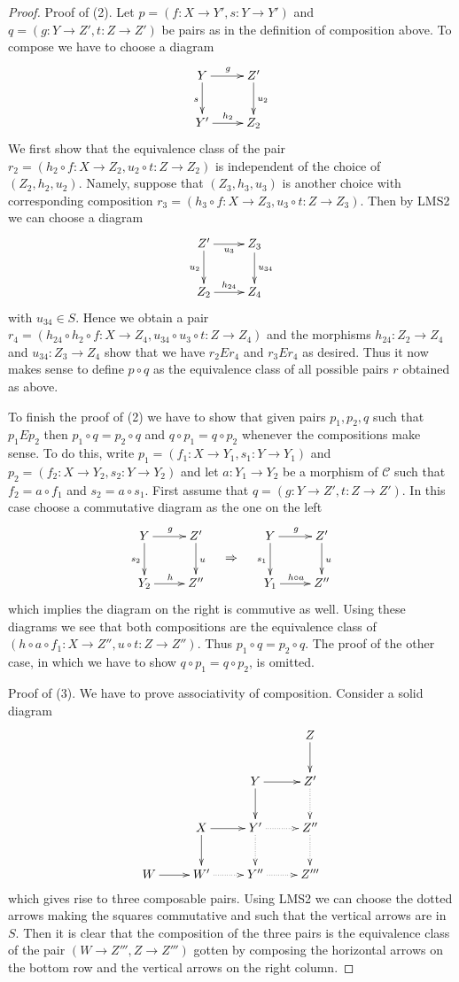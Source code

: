 \begin{proof}
\medskip\noindent
Proof of (2). Let  $p = (f : X \to Y', s : Y \to Y')$ and
$q = (g : Y \to Z', t : Z \to Z')$ be pairs as in the definition of composition
above. To compose we have to choose a diagram
$$
\xymatrix{
Y \ar[d]_s \ar[r]^g & Z' \ar[d]^{u_2} \\
Y' \ar[r]^{h_2} & Z_2
}
$$
We first show that the equivalence class of the pair
$r_2 = (h_2 \circ f : X \to Z_2, u_2 \circ t : Z \to Z_2)$
is independent of the choice of $(Z_2, h_2, u_2)$. Namely, suppose
that $(Z_3, h_3, u_3)$ is another choice with corresponding composition
$r_3 = (h_3 \circ f : X \to Z_3, u_3 \circ t : Z \to Z_3)$.
Then by LMS2 we can choose a diagram
$$
\xymatrix{
Z' \ar[d]_{u_2} \ar[r]_{u_3} & Z_3 \ar[d]^{u_{34}} \\
Z_2 \ar[r]^{h_{24}} & Z_4
}
$$
with $u_{34} \in S$. Hence we obtain a pair
$r_4 =
(h_{24} \circ h_2 \circ f : X \to Z_4, u_{34} \circ u_3 \circ t : Z \to Z_4)$
and the morphisms $h_{24} : Z_2 \to Z_4$ and
$u_{34} : Z_3 \to Z_4$ show that we have $r_2Er_4$ and
$r_3Er_4$ as desired. Thus it now makes sense to define
$p \circ q$ as the equivalence class of all possible pairs $r$
obtained as above.

\medskip\noindent
To finish the proof of (2) we have to show that given pairs
$p_1, p_2, q$ such that $p_1Ep_2$ then $p_1 \circ q = p_2 \circ q$ and
$q \circ p_1 = q \circ p_2$ whenever the compositions make sense.
To do this, write $p_1 = (f_1 : X \to Y_1, s_1 : Y \to Y_1)$ and
$p_2 = (f_2 : X \to Y_2, s_2 : Y \to Y_2)$ and let
$a : Y_1 \to Y_2$ be a morphism of $\mathcal{C}$ such that
$f_2 = a \circ f_1$ and $s_2 = a \circ s_1$.
First assume that $q = (g : Y \to Z', t : Z \to Z')$.
In this case choose a commutative diagram as the one on the left
$$
\vcenter{
\xymatrix{
Y \ar[d]_{s_2} \ar[r]^g & Z' \ar[d]^u \\
Y_2 \ar[r]^h & Z''
}
}
\quad
\Rightarrow
\quad
\vcenter{
\xymatrix{
Y \ar[d]_{s_1} \ar[r]^g & Z' \ar[d]^u \\
Y_1 \ar[r]^{h \circ a} & Z''
}
}
$$
which implies the diagram on the right is commutive as well.
Using these diagrams we see that both compositions are the
equivalence class of
$(h \circ a \circ f_1 : X \to Z'', u \circ t : Z \to Z'')$.
Thus $p_1 \circ q = p_2 \circ q$.
The proof of the other case, in which we have to show 
$q \circ p_1 = q \circ p_2$, is omitted.

\medskip\noindent
Proof of (3). We have to prove associativity of composition.
Consider a solid diagram
$$
\xymatrix{
& & & Z \ar[d] \\
& & Y \ar[d] \ar[r] & Z' \ar@{..>}[d] \\
& X \ar[d] \ar[r] & Y' \ar@{..>}[d] \ar@{..>}[r] & Z'' \ar@{..>}[d] \\
W \ar[r] & W' \ar@{..>}[r] & Y'' \ar@{..>}[r] & Z'''
}
$$
which gives rise to three composable pairs.
Using LMS2 we can choose the dotted arrows making the squares commutative
and such that the vertical arrows are in $S$.
Then it is clear that the composition of the three pairs
is the equivalence class of the pair
$(W \to Z''', Z \to Z''')$ gotten by composing the
horizontal arrows on the bottom row and the vertical arrows
on the right column.
\end{proof}

